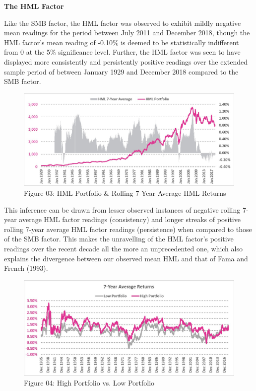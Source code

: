 \documentclass[12pt]{article}
\begin{document}
\noindent \textbf{The HML Factor}

\noindent Like the SMB factor, the HML factor was observed to exhibit mildly negative mean readings for the period between July 2011 and December 2018, though the HML factor's mean reading of -0.10\% is deemed to be statistically indifferent from 0 at the 5\% significance level. Further, the HML factor was seen to have displayed more consistently and persistently positive readings over the extended sample period of between January 1929 and December 2018 compared to the SMB factor.

\begin{figure}[h]
	\centering
	\includegraphics[width=0.9\linewidth]{HML01}
	\caption*{Figure 03: HML Portfolio \& Rolling 7-Year Average HML Returns}
	\label{fig:label}
\end{figure}

\noindent This inference can be drawn from lesser observed instances of negative rolling 7-year average HML factor readings (consistency) and longer streaks of positive rolling 7-year average HML factor readings (persistence) when compared to those of the SMB factor. This makes the unravelling of the HML factor's positive readings over the recent decade all the more an unprecedented one, which also explains the divergence between our observed mean HML and that of Fama and French (1993). 

\begin{figure}[h]
	\centering
	\includegraphics[width=0.9\linewidth]{HML02}
	\caption*{Figure 04: High Portfolio vs. Low Portfolio}
	\label{fig:label}
\end{figure}
\end{document}
